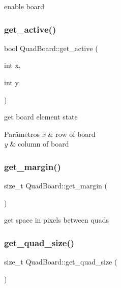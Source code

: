 enable board 

\mbox{\label{classQuadBoard_ab1d424a6388392ea3eb30cdfedb523c1}} 
\subsubsection{\texorpdfstring{get\+\_\+active()}{get\_active()}}
{\footnotesize\ttfamily bool Quad\+Board\+::get\+\_\+active (\begin{DoxyParamCaption}\item[{int}]{x,  }\item[{int}]{y }\end{DoxyParamCaption})}

get board element state 
\begin{DoxyParams}{Parâmetros}
{\em x} & row of board \\
\hline
{\em y} & column of board \\
\hline
\end{DoxyParams}
\mbox{\label{classQuadBoard_abba94e5dec0897d1c17b6ffae8d2b001}} 
\subsubsection{\texorpdfstring{get\+\_\+margin()}{get\_margin()}}
{\footnotesize\ttfamily size\+\_\+t Quad\+Board\+::get\+\_\+margin (\begin{DoxyParamCaption}{ }\end{DoxyParamCaption})\hspace{0.3cm}{\ttfamily [inline]}}



get space in pixels between quads 

\mbox{\label{classQuadBoard_a5d707ba2eb22707cd295117276b0bf9e}} 
\subsubsection{\texorpdfstring{get\+\_\+quad\+\_\+size()}{get\_quad\_size()}}
{\footnotesize\ttfamily size\+\_\+t Quad\+Board\+::get\+\_\+quad\+\_\+size (\begin{DoxyParamCaption}{ }\end{DoxyParamCaption})\hspace{0.3cm}{\ttfamily [inline]}}



